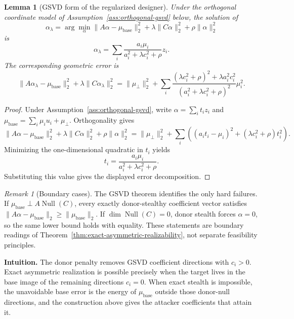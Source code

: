 \documentclass{article}
\theoremstyle{plain}
\newtheorem{lemma}[theorem]{Lemma}
\theoremstyle{definition}
\theoremstyle{remark}
\newtheorem{remark}[theorem]{Remark}
\begin{document}
\begin{lemma}[GSVD form of the regularized designer]
\label{thm:lambda-regularized-realizability}
Under the orthogonal coordinate model of Assumption~\ref{ass:orthogonal-gsvd} below, the solution of
\[
\alpha_\lambda
=
\arg\min_\alpha
\|A\alpha-\mu_{\text{base}}\|_2^2
+
\lambda\|C\alpha\|_2^2
+
\rho\|\alpha\|_2^2
\]
is
\[
\alpha_\lambda
=
\sum_i
\frac{a_i\mu_i}{a_i^2+\lambda c_i^2+\rho}z_i.
\]
The corresponding geometric error is
\[
\|A\alpha_\lambda-\mu_{\text{base}}\|_2^2
+
\lambda\|C\alpha_\lambda\|_2^2
=
\|\mu_\perp\|_2^2
+
\sum_i
\frac{(\lambda c_i^2+\rho)^2+\lambda a_i^2c_i^2}{(a_i^2+\lambda c_i^2+\rho)^2}\mu_i^2.
\]
\end{lemma}

\begin{proof}
Under Assumption~\ref{ass:orthogonal-gsvd}, write $\alpha=\sum_i t_i z_i$ and $\mu_{\text{base}}=\sum_i\mu_i u_i+\mu_\perp$. Orthogonality gives
\[
\|A\alpha-\mu_{\text{base}}\|_2^2
+
\lambda\|C\alpha\|_2^2
+
\rho\|\alpha\|_2^2
=
\|\mu_\perp\|_2^2+
\sum_i\left((a_it_i-\mu_i)^2+(\lambda c_i^2+\rho)t_i^2\right).
\]
Minimizing the one-dimensional quadratic in $t_i$ yields
\[
t_i=\frac{a_i\mu_i}{a_i^2+\lambda c_i^2+\rho}.
\]
Substituting this value gives the displayed error decomposition.
\end{proof}

\begin{remark}[Boundary cases]
\label{thm:asymmetric-failure-conditions}
The GSVD theorem identifies the only hard failures. If $\mu_{\text{base}}\perp A\operatorname{Null}(C)$, every exactly donor-stealthy coefficient vector satisfies $\|A\alpha-\mu_{\text{base}}\|_2\ge \|\mu_{\text{base}}\|_2$. If $\dim\operatorname{Null}(C)=0$, donor stealth forces $\alpha=0$, so the same lower bound holds with equality. These statements are boundary readings of Theorem~\ref{thm:exact-asymmetric-realizability}, not separate feasibility principles.
\end{remark}

\noindent\textbf{Intuition.}
The donor penalty removes GSVD coefficient directions with $c_i>0$. Exact asymmetric realization is possible precisely when the target lives in the base image of the remaining directions $c_i=0$. When exact stealth is impossible, the unavoidable base error is the energy of $\mu_{\text{base}}$ outside those donor-null directions, and the construction above gives the attacker coefficients that attain it.
\end{document}
